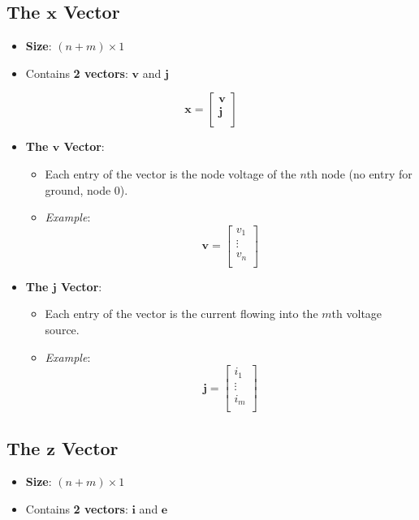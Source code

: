 \documentclass{article}
\begin{document}
\subsection{The $\mathbf{x}$ Vector}
\begin{itemize}
    \item \textbf{Size}: \( (n + m) \times 1 \)
    \item Contains \textbf{2 vectors}: \(\mathbf{v}\) and \(\mathbf{j}\)
\end{itemize}

\[
\mathbf{x} = 
\begin{bmatrix}
\mathbf{v} \\
\mathbf{j} \\
\end{bmatrix}
\]

\begin{itemize}
    \item \textbf{The $\mathbf{v}$ Vector}:
    \begin{itemize}
        \item Each entry of the vector is the node voltage of the \(n\)th node (no entry for ground, node 0).
        \item \textit{Example}: 
        \[
        \mathbf{v} = 
        \begin{bmatrix}
        v_1 \\
        \vdots \\
        v_n \\
        \end{bmatrix}
        \]
    \end{itemize}
    \item \textbf{The $\mathbf{j}$ Vector}:
    \begin{itemize}
        \item Each entry of the vector is the current flowing into the \(m\)th voltage source.
        \item \textit{Example}: 
        \[
        \mathbf{j} = 
        \begin{bmatrix}
        i_1 \\
        \vdots \\
        i_m \\
        \end{bmatrix}
        \]
    \end{itemize}
\end{itemize}

\subsection{The $\mathbf{z}$ Vector}
\begin{itemize}
    \item \textbf{Size}: \( (n + m) \times 1 \)
    \item Contains \textbf{2 vectors}: \(\mathbf{i}\) and \(\mathbf{e}\)
\end{itemize}
\end{document}
